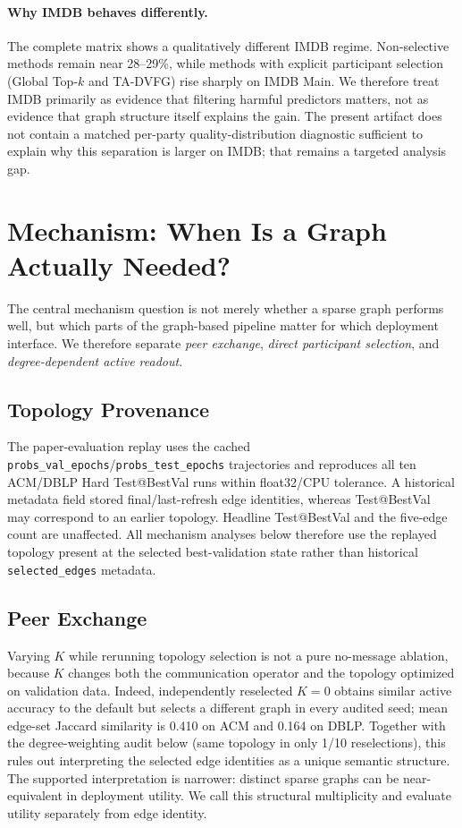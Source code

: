 \documentclass[letterpaper]{article}
\newcommand{\method}{\textsc{TA-DVFG}}
\begin{document}
\paragraph{Why IMDB behaves differently.}
The complete matrix shows a qualitatively different IMDB regime. Non-selective
methods remain near 28--29\%, while methods with explicit participant selection
(Global Top-$k$ and \method{}) rise sharply on IMDB Main. We therefore treat
IMDB primarily as evidence that filtering harmful predictors matters, not as
evidence that graph structure itself explains the gain. The present artifact
does not contain a matched per-party quality-distribution diagnostic sufficient
to explain why this separation is larger on IMDB; that remains a targeted
analysis gap.


\section{Mechanism: When Is a Graph Actually Needed?}
\label{sec:supp-mechanism}

The central mechanism question is not merely whether a sparse graph performs
well, but which parts of the graph-based pipeline matter for which deployment
interface. We therefore separate \emph{peer exchange}, \emph{direct participant
selection}, and \emph{degree-dependent active readout}.

\subsection{Topology Provenance}

The paper-evaluation replay uses the cached
\texttt{probs\_val\_epochs}/\texttt{probs\_test\_epochs} trajectories and
reproduces all ten ACM/DBLP Hard Test@BestVal runs within float32/CPU tolerance.
A historical metadata field stored final/last-refresh edge identities, whereas
Test@BestVal may correspond to an earlier topology. Headline Test@BestVal and
the five-edge count are unaffected. All mechanism analyses below therefore use
the replayed topology present at the selected best-validation state rather than
historical \texttt{selected\_edges} metadata.

\subsection{Peer Exchange}

Varying $K$ while rerunning topology selection is not a pure no-message
ablation, because $K$ changes both the communication operator and the topology
optimized on validation data. Indeed, independently reselected $K=0$ obtains
similar active accuracy to the default but selects a different graph in every
audited seed; mean edge-set Jaccard similarity is 0.410 on ACM and 0.164 on
DBLP. Together with the degree-weighting audit below (same topology in only
1/10 reselections), this rules out interpreting the selected edge identities as
a unique semantic structure. The supported interpretation is narrower:
distinct sparse graphs can be near-equivalent in deployment utility. We call
this structural multiplicity and evaluate utility separately from edge identity.
\end{document}
